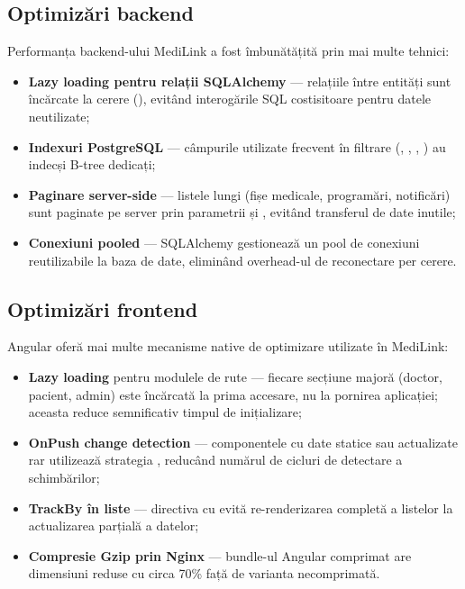 \subsection{Optimizări backend}

Performanța backend-ului MediLink a fost îmbunătățită prin mai multe tehnici:

\begin{itemize}
  \item \textbf{Lazy loading pentru relații SQLAlchemy} --- relațiile între entități sunt încărcate la cerere (), evitând interogările SQL costisitoare pentru datele neutilizate;
  \item \textbf{Indexuri PostgreSQL} --- câmpurile utilizate frecvent în filtrare (, , , ) au indecși B-tree dedicați;
  \item \textbf{Paginare server-side} --- listele lungi (fișe medicale, programări, notificări) sunt paginate pe server prin parametrii  și , evitând transferul de date inutile;
  \item \textbf{Conexiuni pooled} --- SQLAlchemy gestionează un pool de conexiuni reutilizabile la baza de date, eliminând overhead-ul de reconectare per cerere.
\end{itemize}

\subsection{Optimizări frontend}

Angular oferă mai multe mecanisme native de optimizare utilizate în MediLink:

\begin{itemize}
  \item \textbf{Lazy loading} pentru modulele de rute --- fiecare secțiune majoră (doctor, pacient, admin) este încărcată la prima accesare, nu la pornirea aplicației; aceasta reduce semnificativ timpul de inițializare;
  \item \textbf{OnPush change detection} --- componentele cu date statice sau actualizate rar utilizează strategia , reducând numărul de cicluri de detectare a schimbărilor;
  \item \textbf{TrackBy în liste} --- directiva  cu  evită re-renderizarea completă a listelor la actualizarea parțială a datelor;
  \item \textbf{Compresie Gzip prin Nginx} --- bundle-ul Angular comprimat are dimensiuni reduse cu circa 70\% față de varianta necomprimată.
\end{itemize}

